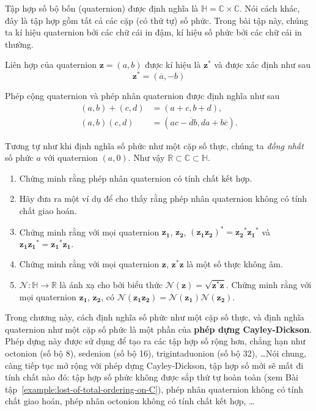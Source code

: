 \begin{exercise}[Quaternion]
	Tập hợp số bộ bốn (quaternion) được định nghĩa là $\mathbb{H} = \mathbb{C}\times\mathbb{C}$. Nói cách khác, đây là tập hợp gồm tất cả các cặp (có thứ tự) số phức. Trong bài tập này, chúng ta kí hiệu quaternion bởi các chữ cái in đậm, kí hiệu số phức bởi các chữ cái in thường.

	Liên hợp của quaternion $\mathbf{z} = (a, b)$ được kí hiệu là ${\mathbf{z}}^{*}$ và được xác định như sau
	\[
		{\mathbf{z}}^{*} = (\overline{a}, -b)
	\]

	Phép cộng quaternion và phép nhân quaternion được định nghĩa như sau
	\begin{align*}
		(a, b) + (c, d) & = (a+c, b+d), \\
		(a,b)(c,d) & = (ac - \overline{d}b, da + b\overline{c}).
	\end{align*}

	Tương tự như khi định nghĩa số phức như một cặp số thực, chúng ta \textit{đồng nhất} số phức $a$ với quaternion $(a, 0)$. Như vậy $\mathbb{R}\subset \mathbb{C}\subset \mathbb{H}$.

	\begin{enumerate}[label={(\roman*)}]
		\item Chứng minh rằng phép nhân quaternion có tính chất kết hợp.
		\item Hãy đưa ra một ví dụ để cho thấy rằng phép nhân quaternion không có tính chất giao hoán.
		\item Chứng minh rằng với mọi quaternion $\mathbf{z_{1}}$, $\mathbf{z_{2}}$, ${(\mathbf{z_{1}}{\mathbf{z_{2}}})}^{*} = {\mathbf{z_{2}}}^{*}{\mathbf{z_{1}}}^{*}$ và $\mathbf{z_{1}}\mathbf{z_{1}}^{*} = \mathbf{z_{1}}^{*}\mathbf{z_{1}}$.
		\item Chứng minh rằng với mọi quaternion $\mathbf{z}$, $\mathbf{z}^{*}\mathbf{z}$ là một số thực không âm.
		\item $\mathcal{N}: \mathbb{H}\to \mathbb{R}$ là ánh xạ cho bởi biểu thức $\mathcal{N}(\mathbf{z}) = \sqrt{\mathbf{z}^{*}\mathbf{z}}$. Chứng minh rằng với mọi quaternion $\mathbf{z_{1}}$, $\mathbf{z_{2}}$, có $\mathcal{N}(\mathbf{z_{1}}\mathbf{z_{2}}) = \mathcal{N}(\mathbf{z_{1}})\mathcal{N}(\mathbf{z_{2}})$.
	\end{enumerate}
\end{exercise}

Trong chương này, cách định nghĩa số phức như một cặp số thực, và định nghĩa quaternion như một cặp số phức là một phần của \textbf{phép dựng Cayley-Dickson}. Phép dựng này được sử dụng để tạo ra các tập hợp số rộng hơn, chẳng hạn như octonion (số bộ 8), sedenion (số bộ 16), trigintaduonion (số bộ 32), \ldots Nói chung, càng tiếp tục mở rộng với phép dựng Cayley-Dickson, tập hợp số mới sẽ mất đi tính chất nào đó: tập hợp số phức không được sắp thứ tự hoàn toàn (xem Bài tập~\ref{example:lost-of-total-ordering-on-C}), phép nhân quaternion không có tính chất giao hoán, phép nhân octonion không có tính chất kết hợp, \ldots
